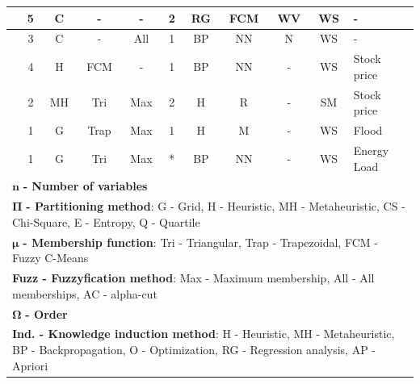 \begin{center}
\begin{landscape}
\begin{longtable}[c]{|m{4cm}|c|c|c|c|c|c|c|c|c|m{5cm}|}
\cite{Yang2018}            & 5                  & C            & -           & -                      & 2              & RG                      & FCM                 & WV                 & WS            & -                     \\ \hline
\cite{Tran2018}            & 3                  & C            & -           & All                    & 1              & BP                            & NN                & N            & WS            & -                     \\ \hline
\cite{Zhang2018}           & 4                  & H                & FCM         & -                      & 1              & BP                             & NN                 & -                        & WS            & Stock price           \\ \hline
\cite{Zhang2018a}          & 2                  & MH         & Tri  & Max                & 2              & H                       & R               & -                        & SM              & Stock price           \\ \hline
\cite{Chen2019}            & 1                  & G                  & Trap & Max                & 1              & H                       & M              & -                        & WS            & Flood \\  \hline
\cite{Sadaei2019}            & 1                  & G                  & Tri & Max                &  *              & BP                       & NN              & -                        & WS            & Energy Load \\  \hline
\multicolumn{11}{l}{$\mathbf{n}$\textbf{ - Number of variables}} \\
\multicolumn{11}{p{20cm}}{$\mathbf{\Pi}$\textbf{ - Partitioning method}: G - Grid, H - Heuristic, MH - Metaheuristic, CS - Chi-Square, E - Entropy, Q - Quartile} \\
\multicolumn{11}{p{20cm}}{$\mathbf{\mu}$\textbf{ - Membership function}: Tri - Triangular, Trap - Trapezoidal, FCM - Fuzzy C-Means} \\
\multicolumn{11}{p{20cm}}{\textbf{Fuzz - Fuzzyfication method}: Max - Maximum membership, All - All memberships, AC - alpha-cut} \\
\multicolumn{11}{l}{$\mathbf{\Omega}$\textbf{  - Order}} \\
\multicolumn{11}{p{20cm}}{\textbf{Ind. - Knowledge induction method}: H - Heuristic, MH - Metaheuristic, BP - Backpropagation, O - Optimization, RG - Regression analysis, AP - Apriori} \\

\end{longtable}
\end{landscape}
\end{center}
